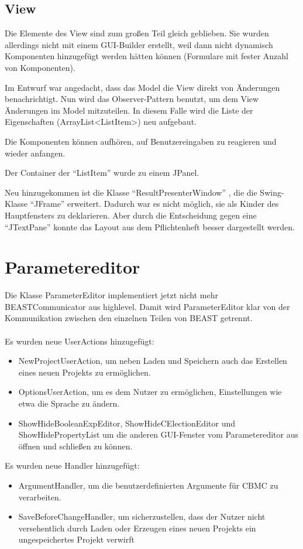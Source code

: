 \documentclass[a4paper]{scrreprt}
\begin{document}
\subsection{View}
Die Elemente des View sind zum großen Teil gleich geblieben. Sie wurden allerdings nicht mit einem GUI-Builder erstellt, weil dann nicht dynamisch Komponenten hinzugefügt werden hätten können (Formulare mit fester Anzahl von Komponenten).

Im Entwurf war angedacht, dass das Model die View direkt von Änderungen benachrichtigt. Nun wird das Observer-Pattern benutzt, um dem View Änderungen im Model mitzuteilen. In diesem Falle wird die Liste der Eigenschaften (ArrayList<ListItem>) neu aufgebaut.

Die Komponenten können aufhören, auf Benutzereingaben zu reagieren und wieder anfangen.

Der Container der "`ListItem"' wurde zu einem JPanel.

Neu hinzugekommen ist die Klasse "`ResultPresenterWindow"' , die die Swing-Klasse "`JFrame"' erweitert. Dadurch war es nicht möglich, sie als Kinder des Hauptfensters zu deklarieren. Aber durch die Entscheidung gegen eine "`JTextPane"' konnte das Layout aus dem Pflichtenheft besser dargestellt werden.

\section{Parametereditor}

Die Klasse ParameterEditor implementiert jetzt nicht mehr BEASTCommunicator aus highlevel. Damit wird ParameterEditor klar von der Kommunikation zwischen den einzelnen Teilen von BEAST getrennt. \\
\\
Es wurden neue UserActions hinzugefügt:
\begin{itemize}
\item NewProjectUserAction, um neben Laden und Speichern auch das Erstellen eines neuen Projekts zu ermöglichen.
\item OptionsUserAction, um es dem Nutzer zu ermöglichen, Einstellungen wie etwa die Sprache zu ändern.
\item ShowHideBooleanExpEditor, ShowHideCElectionEditor und ShowHidePropertyList um die anderen GUI-Fenster vom Parametereditor aus öffnen und schließen zu können.
\end{itemize}
Es wurden neue Handler hinzugefügt:
\begin{itemize}
\item ArgumentHandler, um die benutzerdefinierten Argumente für CBMC zu verarbeiten.
\item SaveBeforeChangeHandler, um sicherzustellen, dass der Nutzer nicht versehentlich durch Laden oder Erzeugen eines neuen Projekts ein ungespeichertes Projekt verwirft
\end{itemize}
\end{document}
